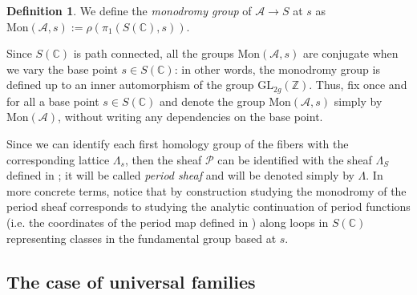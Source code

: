 \documentclass[10 pt,a4paper]{article}
\theoremstyle{plain}
\theoremstyle{definition}
\newtheorem{defn}[thm]{Definition}
\theoremstyle{named}
\newcommand{\cA}{\mathcal A}
\newcommand{\bC}{\mathbb C}
\newcommand{\cP}{\mathcal P}
\newcommand{\bZ}{\mathbb Z}
\begin{document}
\begin{defn}
We define the \emph{monodromy group} of $\cA \to S$ at $s$ as $\textrm{Mon}(\cA,s):= \rho(\pi_1(S(\bC),s))$.
\end{defn}
Since $S(\bC)$ is path connected, all the groups $\textrm{Mon}(\cA,s)$ are conjugate when we vary the base point $s \in S(\bC)$: in other words, the monodromy group is defined up to an inner automorphism of the group $\textrm{GL}_{2g}(\bZ)$. Thus, fix once and for all a base point $s \in S(\bC)$ and denote the group $\textrm{Mon}(\cA,s)$ simply by $\textrm{Mon}(\cA)$, without writing any dependencies on the base point.

Since we can identify each first homology group of the fibers with the corresponding lattice $\Lambda_s$, then the sheaf $\cP$ can be identified with the sheaf $\Lambda_S$ defined in ; it will be called \emph{period sheaf} and will be denoted simply by $\Lambda$. In more concrete terms, notice that by construction studying the monodromy of the period sheaf corresponds to studying the analytic continuation of period functions (i.e. the coordinates of the period map defined in ) along loops in $S(\bC)$ representing classes in the fundamental group based at $s$.



\subsection{The case of universal families}
\end{document}
